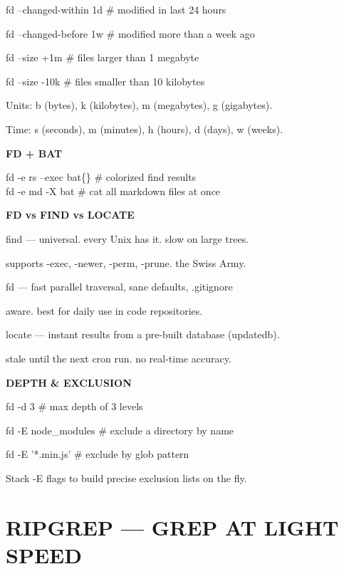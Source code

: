\documentclass[11pt,a4paper,twoside]{book}
\begin{document}
fd --changed-within 1d  \# modified in last 24 hours

fd --changed-before 1w  \# modified more than a week ago

fd --size +1m           \# files larger than 1 megabyte

fd --size -10k          \# files smaller than 10 kilobytes

Units: b (bytes), k (kilobytes), m (megabytes), g (gigabytes).

Time: s (seconds), m (minutes), h (hours), d (days), w (weeks).


\vspace{12pt}
{\bfseries\color{neonyellow} FD + BAT}\vspace{4pt}

\begin{codebox}
fd -e rs --exec bat\{\}   \# colorized find results\\
fd -e md -X bat          \# cat all markdown files at once\\
\end{codebox}


\vspace{12pt}
{\bfseries\color{neonyellow} FD vs FIND vs LOCATE}\vspace{4pt}

find   — universal. every Unix has it. slow on large trees.

supports -exec, -newer, -perm, -prune. the Swiss Army.

fd     — fast parallel traversal, sane defaults, .gitignore

aware. best for daily use in code repositories.

locate — instant results from a pre-built database (updatedb).

stale until the next cron run. no real-time accuracy.


\vspace{12pt}
{\bfseries\color{neonyellow} DEPTH \& EXCLUSION}\vspace{4pt}

fd -d 3              \# max depth of 3 levels

fd -E node\_modules   \# exclude a directory by name

fd -E '*.min.js'     \# exclude by glob pattern

Stack -E flags to build precise exclusion lists on the fly.


\vspace{16pt}


\chapter{RIPGREP — GREP AT LIGHT SPEED}
\end{document}
